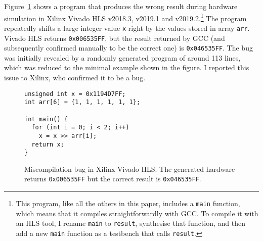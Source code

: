 \begin{example}
\label{ex:vivado_miscomp}
Figure~\ref{fig:vivado_bug1} shows a program that produces the wrong result
during hardware simulation in Xilinx Vivado HLS v2018.3, v2019.1 and
v2019.2.\footnote{This program, like all the others in this paper, includes a
  \texttt{main} function, which means that it compiles straightforwardly with
  GCC. To compile it with an HLS tool, I rename \texttt{main} to
  \texttt{result}, synthesise that function, and then add a new \texttt{main}
  function as a testbench that calls \texttt{result}.} The program repeatedly
shifts a large integer value \texttt{x} right by the values stored in array
\texttt{arr}.  Vivado HLS returns \texttt{0x006535FF}, but the result returned
by GCC (and subsequently confirmed manually to be the correct one) is
\texttt{0x046535FF}. The bug was initially revealed by a randomly generated
program of around 113 lines, which was reduced to the minimal example shown in
the figure.  I reported this issue to Xilinx, who confirmed it to be a bug.
\end{example}

\begin{figure}
\centering
\begin{minipage}{6cm}
\begin{verbatim}
unsigned int x = 0x1194D7FF;
int arr[6] = {1, 1, 1, 1, 1, 1};

int main() {
  for (int i = 0; i < 2; i++)
    x = x >> arr[i];
  return x;
}
\end{verbatim}
\end{minipage}
\caption[Miscompilation bug in Xilinx Vivado HLS v2018.3, v2019.1 and
v2019.2.]{Miscompilation bug in Xilinx Vivado HLS. The generated hardware
  returns \texttt{0x006535FF} but the correct result is \texttt{0x046535FF}.}%
\label{fig:vivado_bug1}
\end{figure}

\def\totaltestcases{6700}
\def\totaltestcasefailures{1191}
\def\numuniquebugs{8}
\def\vivadotestcases{3645}

